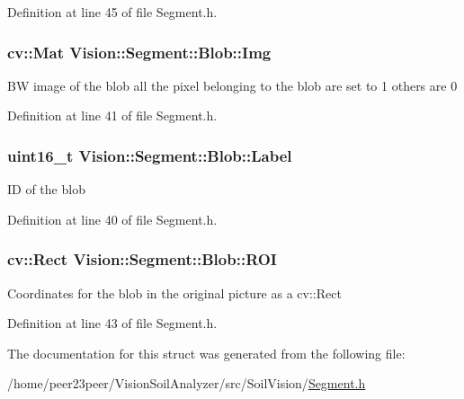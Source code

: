 Definition at line 45 of file Segment.\+h.

\hypertarget{struct_vision_1_1_segment_1_1_blob_a776f587282c775375052461a14b0a304}{}
\subsubsection[{Img}]{\setlength{\rightskip}{0pt plus 5cm}cv\+::\+Mat Vision\+::\+Segment\+::\+Blob\+::\+Img}\label{struct_vision_1_1_segment_1_1_blob_a776f587282c775375052461a14b0a304}
B\+W image of the blob all the pixel belonging to the blob are set to 1 others are 0 

Definition at line 41 of file Segment.\+h.

\hypertarget{struct_vision_1_1_segment_1_1_blob_aaa4c2a0d3f0c920fb8b59417dd54f82b}{}
\subsubsection[{Label}]{\setlength{\rightskip}{0pt plus 5cm}uint16\+\_\+t Vision\+::\+Segment\+::\+Blob\+::\+Label}\label{struct_vision_1_1_segment_1_1_blob_aaa4c2a0d3f0c920fb8b59417dd54f82b}
I\+D of the blob 

Definition at line 40 of file Segment.\+h.

\hypertarget{struct_vision_1_1_segment_1_1_blob_aceb3e938bb4489c08edd9324fdee7465}{}
\subsubsection[{R\+O\+I}]{\setlength{\rightskip}{0pt plus 5cm}cv\+::\+Rect Vision\+::\+Segment\+::\+Blob\+::\+R\+O\+I}\label{struct_vision_1_1_segment_1_1_blob_aceb3e938bb4489c08edd9324fdee7465}
Coordinates for the blob in the original picture as a cv\+::\+Rect 

Definition at line 43 of file Segment.\+h.



The documentation for this struct was generated from the following file\+:\begin{DoxyCompactItemize}
\item 
/home/peer23peer/\+Vision\+Soil\+Analyzer/src/\+Soil\+Vision/\hyperlink{_segment_8h}{Segment.\+h}\end{DoxyCompactItemize}
